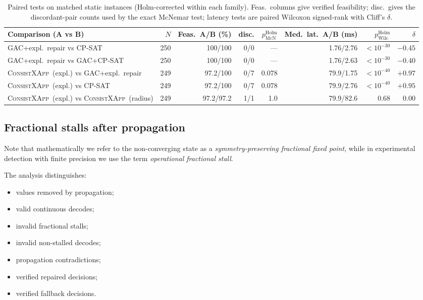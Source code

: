 \documentclass[pdflatex,sn-mathphys-num,iicol,oneside]{sn-jnl}
\newcommand{\method}{\textsc{ConsistXApp}}
\newcommand{\gac}{\textsc{GAC}}
\newcommand{\cpsat}{\textsc{CP-SAT}}
\begin{document}
\begin{table}[t]
\centering
\caption{Paired tests on matched static instances (Holm-corrected
within each family). Feas.\ columns give verified feasibility; disc.\
gives the discordant-pair counts used by the exact McNemar test;
latency tests are paired Wilcoxon signed-rank with Cliff's $\delta$.}
\label{tab:stats-paired}
\setlength{\tabcolsep}{4pt}\small
\begin{tabular}{lrrrrrrr}
\toprule
Comparison (A vs B) & $N$ & Feas.\ A/B (\%) & disc. &
$p_{\mathrm{McN}}^{\mathrm{Holm}}$ & Med.\ lat.\ A/B (ms) &
$p_{\mathrm{Wilc}}^{\mathrm{Holm}}$ & $\delta$\\
\midrule
GAC+expl.\ repair vs \cpsat & 250 & 100/100 & 0/0 & --- & 1.76/2.76 &
$<10^{-30}$ & $-0.45$\\
GAC+expl.\ repair vs \gac+\cpsat & 250 & 100/100 & 0/0 & --- &
1.76/2.63 & $<10^{-30}$ & $-0.40$\\
\method\ (expl.) vs GAC+expl.\ repair & 249 & 97.2/100 & 0/7 & 0.078 &
79.9/1.75 & $<10^{-40}$ & $+0.97$\\
\method\ (expl.) vs \cpsat & 249 & 97.2/100 & 0/7 & 0.078 & 79.9/2.76 &
$<10^{-40}$ & $+0.95$\\
\method\ (expl.) vs \method\ (radius) & 249 & 97.2/97.2 & 1/1 & 1.0 &
79.9/82.6 & 0.68 & $0.00$\\
\bottomrule
\end{tabular}
\normalsize
\end{table}

\subsection{Fractional stalls after propagation}

Note that mathematically we refer to the non-converging state as a
\textit{symmetry-preserving fractional fixed point}, while in
experimental detection with finite precision we use the term
\textit{operational fractional stall}.

The analysis distinguishes:

\begin{itemize}
    \item values removed by propagation;
    \item valid continuous decodes;
    \item invalid fractional stalls;
    \item invalid non-stalled decodes;
    \item propagation contradictions;
    \item verified repaired decisions;
    \item verified fallback decisions.
\end{itemize}
\end{document}
